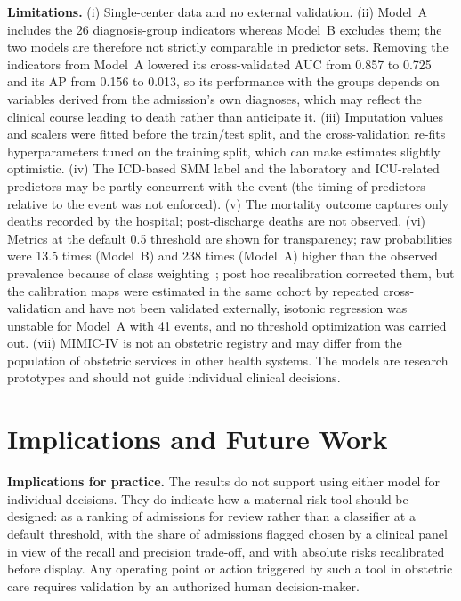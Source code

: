 \documentclass[healthcare,article,submit,pdftex,moreauthors]{Definitions/mdpi}
\begin{document}
\textbf{Limitations.} (i) Single-center data and no external validation. (ii)
Model~A includes the 26 diagnosis-group indicators whereas Model~B excludes them; the
two models are therefore not strictly comparable in predictor sets. Removing the indicators from
Model~A lowered its cross-validated AUC from 0.857 to 0.725 and its AP from 0.156 to 0.013, so its
performance with the groups depends on variables derived from the admission's own diagnoses, which may
reflect the clinical course leading to death rather than anticipate it. (iii) Imputation values and scalers
were fitted before the train/test split, and the cross-validation re-fits
hyperparameters tuned on the training split, which can make estimates slightly
optimistic. (iv) The ICD-based SMM label and the laboratory and ICU-related predictors may be partly concurrent with the
event (the timing of predictors relative to the event was not enforced). (v) The mortality
outcome captures only deaths recorded by the hospital; post-discharge deaths are not
observed. (vi) Metrics at the default 0.5 threshold are shown for transparency;
raw probabilities were 13.5 times (Model~B) and 238 times (Model~A) higher than the observed
prevalence because of class weighting~\cite{NiculescuMizil2005Probabilities,vandenGoorbergh2022Harm,VanCalster2019Calibration}; post hoc recalibration corrected them, but the calibration maps were
estimated in the same cohort by repeated cross-validation and have not been validated externally, isotonic regression was unstable for Model~A with 41 events,
and no threshold optimization was carried out. (vii) MIMIC-IV is not an obstetric
registry and may differ from the population of obstetric services in
other health systems. The models are research prototypes and should not guide
individual clinical decisions.

\section{Implications and Future Work}\label{sec:implications}
\textbf{Implications for practice.} The results do not support using either model for
individual decisions. They do indicate how a maternal risk tool should be designed:
as a ranking of admissions for review rather than a classifier at a default threshold,
with the share of admissions flagged chosen by a clinical panel in view of the recall
and precision trade-off, and with absolute risks recalibrated before display. Any
operating point or action triggered by such a tool in obstetric care requires validation
by an authorized human decision-maker.
\end{document}
